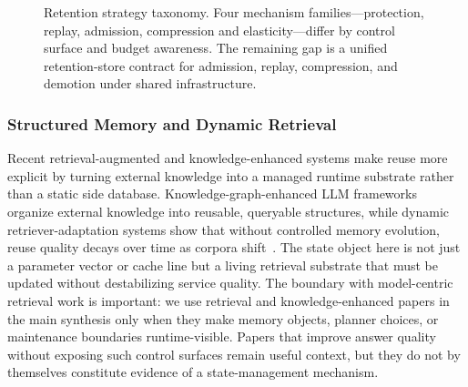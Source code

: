 \documentclass[acmsmall,screen,review]{acmart}
\begin{document}
\begin{figure}[t]
\centering
\resizebox{0.90\textwidth}{!}{}
\caption{Retention strategy taxonomy. Four mechanism families---protection, replay, admission, compression and elasticity---differ by control surface and budget awareness. The remaining gap is a unified retention-store contract for admission, replay, compression, and demotion under shared infrastructure.}
\label{fig:retention-taxonomy}
\end{figure}

\subsubsection{Structured Memory and Dynamic Retrieval}

Recent retrieval-augmented and knowledge-enhanced systems make reuse more explicit by turning external knowledge into a managed runtime substrate rather than a static side database. Knowledge-graph-enhanced LLM frameworks organize external knowledge into reusable, queryable structures, while dynamic retriever-adaptation systems show that without controlled memory evolution, reuse quality decays over time as corpora shift~\cite{li2024keldar,li2025global,zhang2026flowrag}. The state object here is not just a parameter vector or cache line but a living retrieval substrate that must be updated without destabilizing service quality. The boundary with model-centric retrieval work is important: we use retrieval and knowledge-enhanced papers in the main synthesis only when they make memory objects, planner choices, or maintenance boundaries runtime-visible. Papers that improve answer quality without exposing such control surfaces remain useful context, but they do not by themselves constitute evidence of a state-management mechanism.
\end{document}
